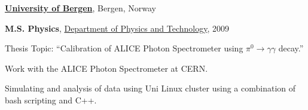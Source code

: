 \documentclass[11pt]{article}
\renewcommand{\section}[2]%
        {\pagebreak[2]\vspace{1.3\baselineskip}%
         \phantomsection\addcontentsline{toc}{section}{#1}%
         \hspace{0in}%
         \marginpar{
         \raggedright \scshape #1}#2}
\newenvironment{outerlist}[1][\enskip\textbullet]%
        {\begin{itemize}[#1]}{\end{itemize}%
         \vspace{-.6\baselineskip}}
\newenvironment{innerlist}[1][\enskip\textbullet]%
        {\begin{compactitem}[#1]}{\end{compactitem}}
\newcommand{\blankline}{\quad\pagebreak[2]}
\begin{document}
\href{http://www.uib.no/en}{\textbf{University of Bergen}},
Bergen, Norway
\begin{outerlist}

\item[] \textbf{M.S. Physics},
  \href{http://www.uib.no/ift/en}
       {Department of Physics and Technology}, 2009
        \begin{innerlist}
          \footnotesize
        \item Thesis Topic: ``Calibration of ALICE Photon Spectrometer
          using $\pi^0\rightarrow\gamma\gamma$ decay.''
        \item Work with the ALICE Photon Spectrometer at CERN.
        \item Simulating and analysis of data using Uni Linux cluster using a combination of bash scripting and C++.
        \end{innerlist}


\end{outerlist}







\end{document}
